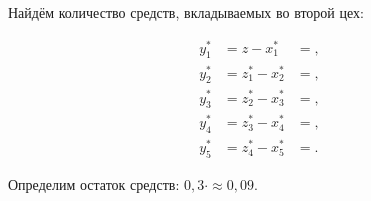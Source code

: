 Найдём количество средств, вкладываемых во второй цех:

\begin{equation}
  \begin{aligned}
    y^*_1 &= z - x^*_1     &= , \\
    y^*_2 &= z^*_1 - x^*_2 &= , \\
    y^*_3 &= z^*_2 - x^*_3 &= , \\
    y^*_4 &= z^*_3 - x^*_4 &= , \\
    y^*_5 &= z^*_4 - x^*_5 &= .
  \end{aligned}
\end{equation}

Определим остаток средств: $ 0,3 \cdot  \approx 0,09 $.

\newpage
